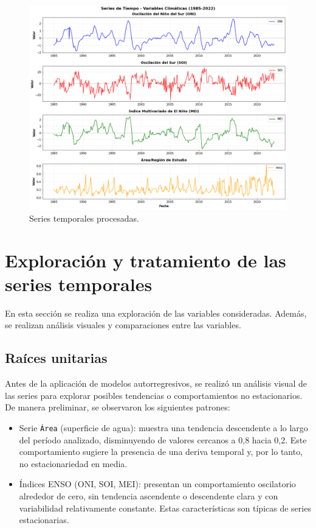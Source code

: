 \begin{figure}[ht]
        \centering
        \includegraphics[scale=.32]
        {Figures/ts_final.png}
        \caption{Series temporales procesadas.}
        \label{fig:ts_final}
\end{figure}
\FloatBarrier 
 
\section{Exploración y tratamiento de las series temporales}
En esta sección se realiza una exploración de las variables consideradas. Además, se realizan análisis visuales y comparaciones entre las variables. 

\subsection{Raíces unitarias}

Antes de la aplicación de modelos autorregresivos, se realizó un análisis visual de las 
series para explorar posibles tendencias o comportamientos no estacionarios. De manera 
preliminar, se observaron los siguientes patrones:

\begin{itemize}
    \item Serie \texttt{Área} (superficie de agua): muestra una tendencia descendente a lo 
    largo del período analizado, disminuyendo de valores cercanos a 0,8 hacia 0,2. Este 
    comportamiento sugiere la presencia de una deriva temporal y, por lo tanto, 
    no estacionariedad en media.
    \item Índices ENSO (ONI, SOI, MEI): presentan un comportamiento oscilatorio 
    alrededor de cero, sin tendencia ascendente o descendente clara y con variabilidad 
    relativamente constante. Estas características son típicas de series estacionarias.
\end{itemize}

